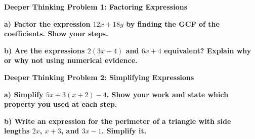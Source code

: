 \documentclass[12pt, letterpaper, fleqn]{article}
\begin{document}
\begin{tcolorbox}[colback=yellow!15, colframe=orange, boxrule=1.5pt, arc=4mm, left=6mm, right=6mm, top=5mm, bottom=5mm]
\textbf{Deeper Thinking Problem 1: Factoring Expressions}

\medskip

\noindent
\textbf{a) Factor the expression $12x + 18y$ by finding the GCF of the coefficients. Show your steps.}

\vspace{2cm}

\noindent
\textbf{b) Are the expressions $2(3x + 4)$ and $6x + 4$ equivalent? Explain why or why not using numerical evidence.}

\vspace{2cm}
\end{tcolorbox}
\newpage

\begin{tcolorbox}[colback=yellow!15, colframe=orange, boxrule=1.5pt, arc=4mm, left=6mm, right=6mm, top=5mm, bottom=5mm]
\textbf{Deeper Thinking Problem 2: Simplifying Expressions}

\medskip

\noindent
\textbf{a) Simplify $5x + 3(x + 2) - 4$. Show your work and state which property you used at each step.}

\vspace{2cm}

\noindent
\textbf{b) Write an expression for the perimeter of a triangle with side lengths $2x$, $x+3$, and $3x-1$. Simplify it.}

\vspace{2cm}
\end{tcolorbox}
\newpage
\end{document}
